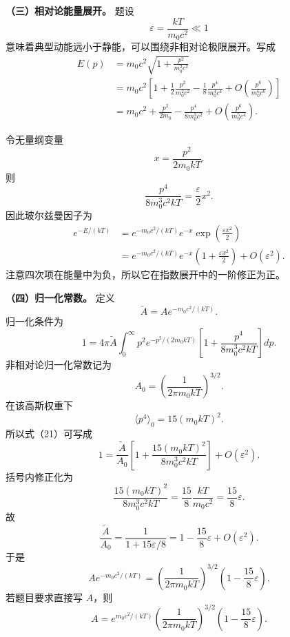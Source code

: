 \documentclass[12pt,a4paper,UTF8]{ctexart}
\begin{document}
\textbf{（三）相对论能量展开。} 题设 \[
\varepsilon=\frac{kT}{m_0c^2}\ll1
\] 意味着典型动能远小于静能，可以围绕非相对论极限展开。写成 \[
\begin{aligned}
E(p)
&=m_0c^2\sqrt{1+\frac{p^2}{m_0^2c^2}}\\
&=m_0c^2\left[
1+\frac12\frac{p^2}{m_0^2c^2}
-\frac18\frac{p^4}{m_0^4c^4}
+O\left(\frac{p^6}{m_0^6c^6}\right)
\right]\\
&=m_0c^2+\frac{p^2}{2m_0}
-\frac{p^4}{8m_0^3c^2}
+O\left(\frac{p^6}{m_0^5c^4}\right).
\end{aligned} \tag{16}
\]

令无量纲变量 \[
x=\frac{p^2}{2m_0kT}. \tag{17}
\] 则 \[
\frac{p^4}{8m_0^3c^2kT}
=\frac{\varepsilon}{2}x^2. \tag{18}
\] 因此玻尔兹曼因子为 \[
\begin{aligned}
e^{-E/(kT)}
&=e^{-m_0c^2/(kT)}
e^{-x}
\exp\left(\frac{\varepsilon x^2}{2}\right)\\
&=e^{-m_0c^2/(kT)}
e^{-x}
\left(1+\frac{\varepsilon x^2}{2}\right)
+O(\varepsilon^2).
\end{aligned} \tag{19}
\] 注意四次项在能量中为负，所以它在指数展开中的一阶修正为正。

\textbf{（四）归一化常数。} 定义 \[
\widetilde A
=Ae^{-m_0c^2/(kT)}. \tag{20}
\] 归一化条件为 \[
1=4\pi\widetilde A
\int_0^\infty
p^2e^{-p^2/(2m_0kT)}
\left[
1+\frac{p^4}{8m_0^3c^2kT}
\right]dp. \tag{21}
\] 非相对论归一化常数记为 \[
A_0=\left(\frac1{2\pi m_0kT}\right)^{3/2}. \tag{22}
\] 在该高斯权重下 \[
\langle p^4\rangle_0
=15(m_0kT)^2. \tag{23}
\] 所以式（21）可写成 \[
1=\frac{\widetilde A}{A_0}
\left[
1+\frac{15(m_0kT)^2}
{8m_0^3c^2kT}
\right]
+O(\varepsilon^2). \tag{24}
\] 括号内修正化为 \[
\frac{15(m_0kT)^2}
{8m_0^3c^2kT}
=\frac{15}{8}\frac{kT}{m_0c^2}
=\frac{15}{8}\varepsilon. \tag{25}
\] 故 \[
\frac{\widetilde A}{A_0}
=\frac1{1+15\varepsilon/8}
=1-\frac{15}{8}\varepsilon
+O(\varepsilon^2). \tag{26}
\] 于是 \[
\boxed{
Ae^{-m_0c^2/(kT)}
=\left(\frac1{2\pi m_0kT}\right)^{3/2}
\left(1-\frac{15}{8}\varepsilon\right)
}. \tag{27}
\] 若题目要求直接写 \(A\)，则 \[
\boxed{
A=e^{m_0c^2/(kT)}
\left(\frac1{2\pi m_0kT}\right)^{3/2}
\left(1-\frac{15}{8}\varepsilon\right)
}. \tag{28}
\]
\end{document}
